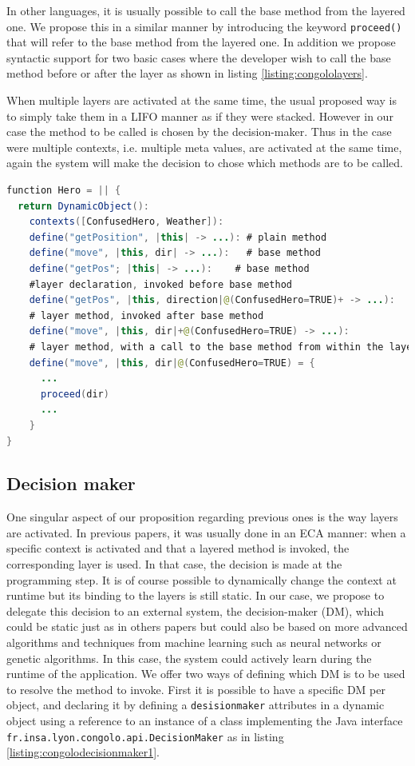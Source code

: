 \documentclass[a4paper]{article}
\begin{document}
In other languages, it is usually possible to call the base method from the layered one. We propose this in a similar manner by introducing the keyword \lstinline|proceed()| that will refer to the base method from the layered one. In addition we propose syntactic support for two basic cases where the developer wish to call the base method before or after the layer as shown in listing \ref{listing:congololayers}.

When multiple layers are activated at the same time, the usual proposed way is to simply take them in a LIFO manner as if they were stacked. However in our case the method to be called is chosen by the decision-maker. Thus in the case were multiple contexts, i.e. multiple meta values, are activated at the same time, again the system will make the decision to chose which methods are to be called.

\begin{lstlisting}[float, language=Java, caption=ConGolo layers example, label={listing:congololayers}]
function Hero = || {
  return DynamicObject():
    contexts([ConfusedHero, Weather]):
    define("getPosition", |this| -> ...): # plain method
    define("move", |this, dir| -> ...):   # base method
    define("getPos"; |this| -> ...):    # base method
    #layer declaration, invoked before base method
    define("getPos", |this, direction|@(ConfusedHero=TRUE)+ -> ...):
    # layer method, invoked after base method
    define("move", |this, dir|+@(ConfusedHero=TRUE) -> ...):
    # layer method, with a call to the base method from within the layer
    define("move", |this, dir|@(ConfusedHero=TRUE) = {
      ...
      proceed(dir)
      ...
    }
}
\end{lstlisting}

\subsection{Decision maker}
\label{subsection:decisionmaker}

One singular aspect of our proposition regarding previous ones is the way layers are activated. In previous papers, it was usually done in an ECA manner: when a specific context is activated and that a layered method is invoked, the corresponding layer is used. In that case, the decision is made at the programming step. It is of course possible to dynamically change the context at runtime but its binding to the layers is still static. In our case, we propose to delegate this decision to an external system, the decision-maker (DM), which could be static just as in others papers but could also be based on more advanced algorithms and techniques from machine learning such as neural networks or genetic algorithms.  In this case, the system could actively learn during the runtime of the application. We offer two ways of defining which DM is to be used to resolve the method to invoke. First it is possible to have a specific DM per object, and declaring it by defining a \lstinline|desisionmaker| attributes in a dynamic object using a reference to an instance of a class implementing the Java interface \lstinline|fr.insa.lyon.congolo.api.DecisionMaker| as in listing \ref{listing:congolodecisionmaker1}.
\end{document}
